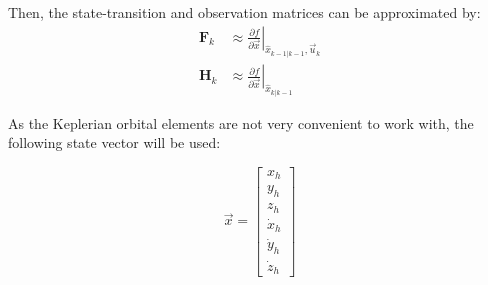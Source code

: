 \documentclass[a4paper,10pt]{article}
\begin{document}
Then, the state-transition and observation matrices can be approximated by:
\begin{align}
 \mathbf{F}_k &\approx \left. \frac{\partial f}{\partial \vec{x}} \right|_{\hat{x}_{k-1|k-1},\vec{u}_k} \\
 \mathbf{H}_k &\approx \left. \frac{\partial f}{\partial \vec{x}} \right|_{\hat{x}_{k|k-1}}
\end{align}

As the Keplerian orbital elements are not very convenient to work with, the following state vector will be used:

\begin{equation}
 \vec{x} = \begin{bmatrix} x_h \\ y_h \\ z_h \\ \dot{x}_h \\ \dot{y}_h \\ \dot{z}_h \end{bmatrix}
\end{equation}
\end{document}
